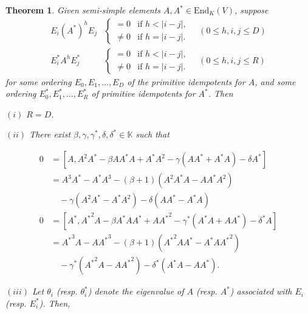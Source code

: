 \documentclass[
]{book}
\newtheorem{theorem}{Theorem}[chapter]
\theoremstyle{definition}
\theoremstyle{definition}
\theoremstyle{definition}
\theoremstyle{definition}
\theoremstyle{remark}
\begin{document}
\begin{theorem}
\protect\hypertarget{thm:aastar}{}\label{thm:aastar}Given semi-simple elements \(A, A^*\in \mathrm{End}_K(V)\), suppose
\begin{align}
E_i(A^*)^hE_j & \begin{cases} = 0 & \text{if } h < |i-j|,\\
\neq 0 & \text{if } h = |i-j|.\end{cases} \quad (0\leq h,i,j\leq D) \label{eq:eastare}\\
E^*_iA^hE^*_j & \begin{cases} = 0 & \text{if } h < |i-j|,\\
\neq 0 & \text{if } h = |i-j|.\end{cases} \quad (0\leq h,i,j\leq R) \label{eq:estaraestar}
\end{align}
for some ordering \(E_0, E_1, \ldots, E_D\) of the primitive idempotents for \(A\), and some ordering \(E^*_0, E^*_1, \ldots, E^*_R\) of primitive idempotents for \(A^*\). Then

\((i)\) \(R = D\).

\((ii)\) There exist \(\beta, \gamma, \gamma^*, \delta, \delta^*\in \mathbb{K}\) such that

\begin{align}
0 & = [A, A^2A^*-\beta AA^*A + A^*A^2 - \gamma(AA^*+A^*A) - \delta A^*]  \label{eq:abracket}\\
& = A^3A^*-A^*A^3 - (\beta+1)(A^2A^*A-AA^*A^2)\\
& \quad -\gamma(A^2A^*-A^*A^2)-\delta(AA^*-A^*A)  \label{eq:aastar}\\
0 & = [A^*, {A^*}^2A-\beta A^*AA^* + A{A^*}^2 - \gamma^*(A^*A+AA^*) - \delta^* A]  \label{eq:astarbracket}\\
& = {A^*}^3A - A{A^*}^3 - (\beta+1)({A^*}^2AA^*-A^*A{A^*}^2)\\
& \quad -\gamma^*({A^*}^2A-A{A^*}^2)-\delta^*(A^*A-AA^*).  \label{eq:astara}
\end{align}

\((iii)\) Let \(\theta_i\) (resp. \(\theta^*_i\)) denote the eigenvalue of \(A\) (resp. \(A^*\)) associated with \(E_i\) (resp. \(E^*_i\)). Then,


\end{theorem}
\end{document}
